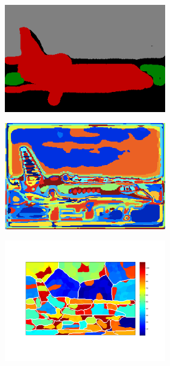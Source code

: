 \documentclass{article} %
\begin{document}
\begin{figure}
\begin{subfigure}[c]{\textwidth}
\begin{subfigure}[c]{0.195\textwidth}
			\label{fig:4_1_s}
		\end{subfigure}
		\begin{subfigure}[c]{0.195\textwidth}
			\includegraphics[width = \textwidth]{./img/4_1_s_GT.png}
			\label{fig:4_1_s_lab}
		\end{subfigure}
		\begin{subfigure}[c]{0.195\textwidth}
			\includegraphics[width = \textwidth]{./img/4_1_s_map.png}
			\label{fig:4_1_s_map}
		\end{subfigure}
		\begin{subfigure}[]{0.195\textwidth}
			\includegraphics[width = \textwidth]{./img/su4_1_s.pdf}

\end{subfigure}
\end{subfigure}
\end{figure}
\end{document}
